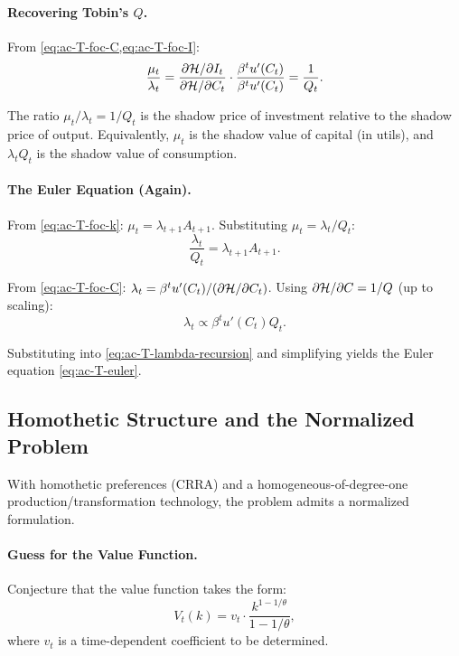 \paragraph{Recovering Tobin's $Q$.}
From \cref{eq:ac-T-foc-C,eq:ac-T-foc-I}:
\begin{equation}
\frac{\mu_t}{\lambda_t} = \frac{\partial \mathcal{H} / \partial I_t}{\partial \mathcal{H} / \partial C_t} \cdot \frac{\beta^t u'(C_t)}{\beta^t u'(C_t)} = \frac{1}{Q_t}.
\label{eq:ac-T-mu-lambda}
\end{equation}

The ratio $\mu_t / \lambda_t = 1/Q_t$ is the shadow price of investment relative to the shadow price of output. Equivalently, $\mu_t$ is the shadow value of capital (in utils), and $\lambda_t Q_t$ is the shadow value of consumption.

\paragraph{The Euler Equation (Again).}
From \cref{eq:ac-T-foc-k}: $\mu_t = \lambda_{t+1} A_{t+1}$. Substituting $\mu_t = \lambda_t / Q_t$:
\begin{equation}
\frac{\lambda_t}{Q_t} = \lambda_{t+1} A_{t+1}.
\label{eq:ac-T-lambda-recursion}
\end{equation}

From \cref{eq:ac-T-foc-C}: $\lambda_t = \beta^t u'(C_t) / (\partial \mathcal{H} / \partial C_t)$. Using $\partial \mathcal{H} / \partial C = 1/Q$ (up to scaling):
\begin{equation}
\lambda_t \propto \beta^t u'(C_t) Q_t.
\label{eq:ac-T-lambda-prop}
\end{equation}

Substituting into \cref{eq:ac-T-lambda-recursion} and simplifying yields the Euler equation \cref{eq:ac-T-euler}.

\subsection{Homothetic Structure and the Normalized Problem}
\label{subsec:ac-T-homothetic}

With homothetic preferences (CRRA) and a homogeneous-of-degree-one production/transformation technology, the problem admits a normalized formulation.

\paragraph{Guess for the Value Function.}
Conjecture that the value function takes the form:
\begin{equation}
V_t(k) = v_t \cdot \frac{k^{1-1/\theta}}{1 - 1/\theta},
\label{eq:ac-T-value-guess}
\end{equation}
where $v_t$ is a time-dependent coefficient to be determined.

